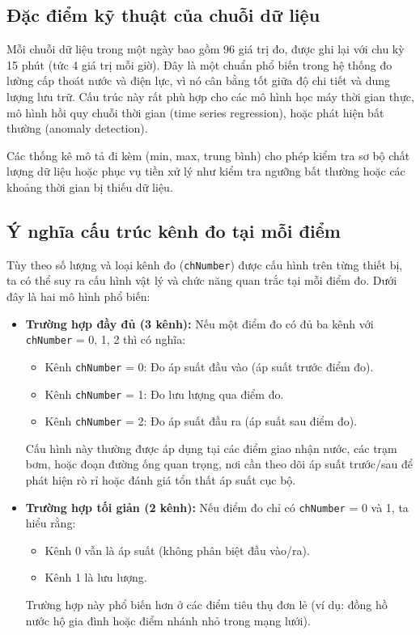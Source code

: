 \subsection{Đặc điểm kỹ thuật của chuỗi dữ liệu}

Mỗi chuỗi dữ liệu trong một ngày bao gồm 96 giá trị đo, được ghi lại với chu kỳ 15 phút (tức 4 giá trị mỗi giờ). Đây là một chuẩn phổ biến trong hệ thống đo lường cấp thoát nước và điện lực, vì nó cân bằng tốt giữa độ chi tiết và dung lượng lưu trữ. Cấu trúc này rất phù hợp cho các mô hình học máy thời gian thực, mô hình hồi quy chuỗi thời gian (time series regression), hoặc phát hiện bất thường (anomaly detection).

Các thống kê mô tả đi kèm (min, max, trung bình) cho phép kiểm tra sơ bộ chất lượng dữ liệu hoặc phục vụ tiền xử lý như kiểm tra ngưỡng bất thường hoặc các khoảng thời gian bị thiếu dữ liệu.

\subsection{Ý nghĩa cấu trúc kênh đo tại mỗi điểm}

Tùy theo số lượng và loại kênh đo (\texttt{chNumber}) được cấu hình trên từng thiết bị, ta có thể suy ra cấu hình vật lý và chức năng quan trắc tại mỗi điểm đo. Dưới đây là hai mô hình phổ biến:

\begin{itemize}
    \item \textbf{Trường hợp đầy đủ (3 kênh):} Nếu một điểm đo có đủ ba kênh với \texttt{chNumber} = 0, 1, 2 thì có nghĩa:
    \begin{itemize}
        \item Kênh \texttt{chNumber} = 0: Đo áp suất đầu vào (áp suất trước điểm đo).
        \item Kênh \texttt{chNumber} = 1: Đo lưu lượng qua điểm đo.
        \item Kênh \texttt{chNumber} = 2: Đo áp suất đầu ra (áp suất sau điểm đo).
    \end{itemize}
    Cấu hình này thường được áp dụng tại các điểm giao nhận nước, các trạm bơm, hoặc đoạn đường ống quan trọng, nơi cần theo dõi áp suất trước/sau để phát hiện rò rỉ hoặc đánh giá tổn thất áp suất cục bộ.
    
    \item \textbf{Trường hợp tối giản (2 kênh):} Nếu điểm đo chỉ có \texttt{chNumber} = 0 và 1, ta hiểu rằng:
    \begin{itemize}
        \item Kênh 0 vẫn là áp suất (không phân biệt đầu vào/ra).
        \item Kênh 1 là lưu lượng.
    \end{itemize}
    Trường hợp này phổ biến hơn ở các điểm tiêu thụ đơn lẻ (ví dụ: đồng hồ nước hộ gia đình hoặc điểm nhánh nhỏ trong mạng lưới).
\end{itemize}

